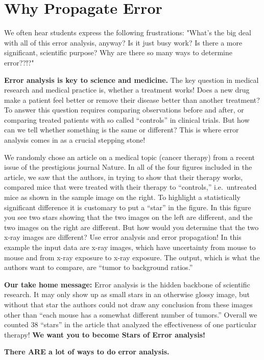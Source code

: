 \section*{Why Propagate Error}
We often hear students express the following frustrations: "What's the big deal with all of
this error analysis, anyway? Is it just busy work? Is there a more significant, scientific purpose?
Why are there so many ways to determine error??!?"
\par
\textbf{Error analysis is key to science and medicine.}
The key question in medical research and medical practice is, whether a treatment works! 
Does a new drug make a patient feel better or remove their disease better than another treatment? 
To answer this question requires comparing observations before and after, or comparing treated patients with so called ``controls'' in clinical trials. 
But how can we tell whether something is the same or different? 
This is where error analysis comes in as a crucial stepping stone!
\par
We randomly chose an article on a medical topic (cancer therapy) from a recent issue of the prestigious journal Nature. 
In all of the four figures included in the article, we saw that the authors, in trying to show that their therapy works, compared mice that were treated with their therapy to ``controls,'' i.e.\ untreated mice as shown in the sample image on the right. 
To highlight a statistically significant difference it is customary to put a ``star'' in the figure. 
In this figure you see two stars showing that the two images on the left are different, and the two images on the right are different. 
But how would you determine that the two x-ray images are different? 
Use error analysis and error propagation! 
In this example the input data are x-ray images, which have uncertainty from mouse to mouse and from x-ray exposure to x-ray exposure. 
The output, which is what the authors want to compare, are ``tumor to background ratios.''
\par 
\textbf{Our take home message:} Error analysis is the hidden backbone of scientific research. 
It may only show up as small stars in an otherwise glossy image, but without that star the authors could not draw any conclusion from these images other than ``each mouse has a somewhat different number of tumors.'' 
Overall we counted 38 ``stars'' in the article that analyzed the effectiveness of one particular therapy! 
\textbf{We want you to become Stars of Error analysis!}
\par 
\textbf{There ARE a lot of ways to do error analysis.} 
